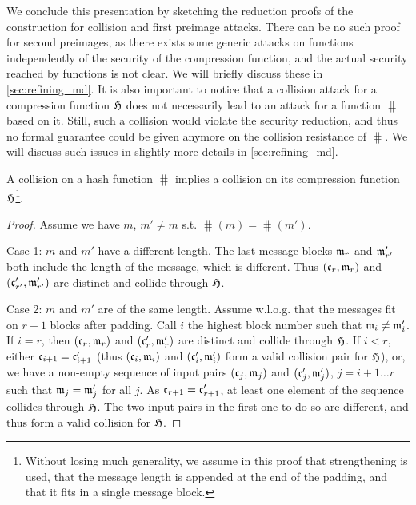 We conclude this presentation by sketching the reduction proofs of the construction for collision and first preimage attacks. There can be no such proof
for second preimages, as there exists some generic attacks on \merkdam functions independently of the security of the compression function, and the actual
security reached by \merkdam functions is not clear. We will
briefly discuss these in \autoref{sec:refining_md}.
It is also important to notice that a collision attack for a compression function $\operatorname{\mathfrak{H}}$ does not necessarily lead
to an attack for a \merkdam function $\hash$ based on it. Still, such a collision would violate the security reduction, and thus no formal guarantee could be given
anymore on the collision resistance of $\hash$. We will discuss such issues in slightly more details in \autoref{sec:refining_md}.

\begin{prop}
A collision on a \merkdam hash function $\hash$ implies a collision on its compression function $\operatorname{\mathfrak{H}}$\footnote{Without losing much generality, we assume in this proof
that \merkdam strengthening is used, that the message length is appended at the end of the padding, and that it fits in a single message block.}.
\end{prop}
\begin{proof}
Assume we have $m$, $m' \neq m$ s.t. $\hash(m) = \hash(m')$.

Case 1: $m$ and $m'$ have a different length.
The last message blocks $\mathfrak{m}_r$ and $\mathfrak{m}'_{r'}$ both include the length
of the message, which is different. Thus $(\mathfrak{c}_r,\mathfrak{m}_r)$ and $(\mathfrak{c}'_{r'}, \mathfrak{m}'_{r'})$ are distinct and collide through $\operatorname{\mathfrak{H}}$.

Case 2: $m$ and $m'$ are of the same length. Assume w.l.o.g. that the messages fit on $r + 1$ blocks after padding.
Call $i$ the highest block number such that $\mathfrak{m}_{i} \neq \mathfrak{m}'_{i}$. If $i = r$, then $(\mathfrak{c}_r,\mathfrak{m}_r)$ and $(\mathfrak{c}'_{r}, \mathfrak{m}'_{r})$
are distinct and collide through $\operatorname{\mathfrak{H}}$. If $i < r$, either $\mathfrak{c}_{i+1} = \mathfrak{c}'_{i+1}$ (thus $(\mathfrak{c}_i,\mathfrak{m}_i)$ and $(\mathfrak{c}'_{i}, \mathfrak{m}'_{i})$
form a valid collision pair for $\operatorname{\mathfrak{H}}$), or, we have a non-empty sequence of input pairs $(\mathfrak{c}_j, \mathfrak{m}_j)$ and $(\mathfrak{c}'_j, \mathfrak{m}'_j)$,
$j = i+1\ldots r$ such that $\mathfrak{m}_j = \mathfrak{m}'_j$ for all $j$. As $\mathfrak{c}_{r+1} = \mathfrak{c}'_{r+1}$, at least one element of the sequence
collides through $\operatorname{\mathfrak{H}}$. The two input pairs in the first one to do so are different, and thus form a valid collision for $\operatorname{\mathfrak{H}}$.
\end{proof}

